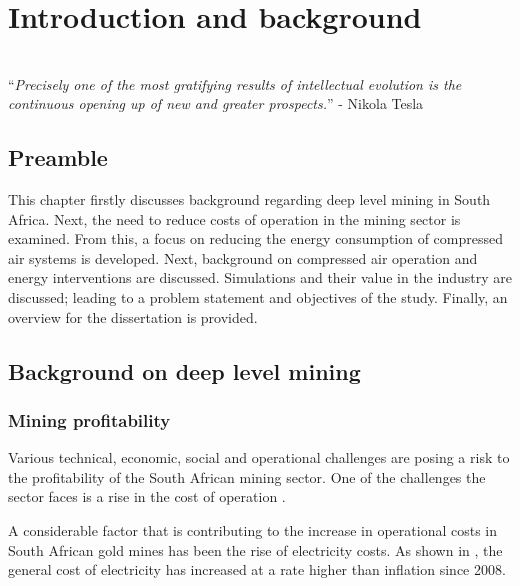 \chapter{Introduction and background}  %
\thispagestyle{empty}
\vspace{40em}
\hrulefill
\\
\enquote{\textit{Precisely one of the most gratifying results of intellectual evolution is the continuous opening up of new and greater prospects.}} -  Nikola Tesla\\
\newpage

\section{Preamble}
This chapter firstly discusses background regarding deep level mining in South Africa. Next, the need to reduce costs of operation in the mining sector is examined. From this, a focus on reducing the energy consumption of compressed air systems is developed. Next, background on compressed air operation and energy interventions are discussed. Simulations and their value in the industry are discussed; leading to a problem statement and objectives of the study. Finally, an overview for the dissertation is provided.
\section{Background on deep level mining}
	\subsection{Mining profitability}
	
	 	Various technical, economic, social and operational challenges are posing a risk to the profitability of the South African mining sector. One of the challenges the sector faces is a rise in the cost of operation \cite{neingo2016trends}.
	 	\par
	 	
		A considerable factor that is contributing to the increase in operational costs in South African gold mines has been the rise of electricity costs. As shown in , the general cost of electricity has increased at a rate higher than inflation since 2008\footnotemark[1].
		

